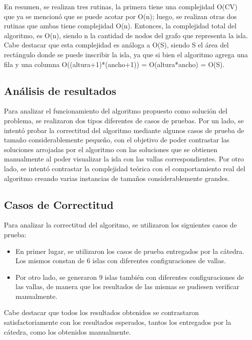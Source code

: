\documentclass[a4paper, 12pt]{article}
\begin{document}
En resumen, se realizan tres rutinas, la primera tiene una complejidad O(CV) que ya se mencionó que se puede acotar por O(n); luego, se realizan otras dos rutinas que ambas tiene complejidad O(n). Entonces, la complejidad total del algoritmo, es O(n), siendo n la cantidad de nodos del grafo que representa la isla. Cabe destacar que esta complejidad es análoga a O(S), siendo S el área del rectángulo donde se puede inscribir la isla, ya que si bien el algoritmo agrega una fila y una columna O((altura+1)*(ancho+1)) = O(altura*ancho) = O(S).

\subsection*{Análisis de resultados}
Para analizar el funcionamiento del algoritmo propuesto como solución del problema, se realizaron dos tipos diferentes de casos de pruebas. Por un lado, se intentó probar la correctitud del algoritmo mediante algunos casos de prueba de tama\~{n}o considerablemente peque\~{n}o, con el objetivo de poder contrastar las soluciones arrojadas por el algoritmo con las soluciones que se obtienen manualmente al poder visualizar la isla con las vallas correspondientes. Por otro lado, se intentó contrastar la complejidad teórica con el comportamiento real del algoritmo creando varias instancias de tama\~{n}os considerablemente grandes.

\subsection*{Casos de Correctitud}
Para analizar la correctitud del algoritmo, se utilizaron los siguientes casos de prueba:
\begin{itemize}
\item En primer lugar, se utilizaron los casos de prueba entregados por la cátedra. Los mismos constan de 6 islas con diferentes configuraciones de vallas.
\item Por otro lado, se generaron 9 islas también con diferentes configuraciones de las vallas, de manera que los resultados de las mismas se pudiesen verificar manualmente.
\end{itemize}

Cabe destacar que todos los resultados obtenidos se contrastaron satisfactoriamente con los resultados esperados, tantos los entregados por la cátedra, como los obtenidos manualmente.
\end{document}
